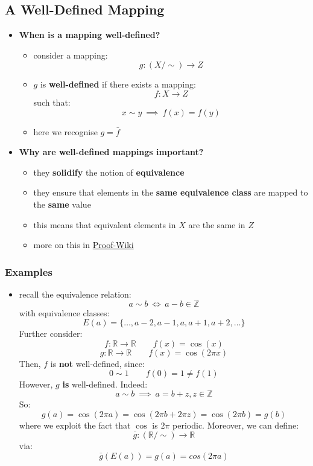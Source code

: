 \documentclass{exam}
\begin{document}
\subsection{A Well-Defined Mapping}

\begin{itemize}
    \item \textbf{When is a mapping well-defined?}
    \begin{itemize}
        \item consider a mapping:
        \[
        g : (X/\sim) \to Z
        \]
        \item $g$ is \textbf{well-defined} if there exists a mapping:
        \[
        f : X \to Z
        \]
        such that:
        \[
        x \sim y \ \implies \ f(x) = f(y)
        \]
        \item here we recognise $g = \bar{f}$
    \end{itemize}
    \item \textbf{Why are well-defined mappings important?}
    \begin{itemize}
        \item they \textbf{solidify} the notion of \textbf{equivalence}
        \item they ensure that elements in the \textbf{same equivalence class} are mapped to the \textbf{same} value
        \item this means that equivalent elements in $X$ are the same in $Z$
        \item more on this in \href{https://proofwiki.org/wiki/Definition:Well-Defined/Mapping}{Proof-Wiki}
    \end{itemize}
\end{itemize}

\subsubsection{Examples}

\begin{itemize}
    \item recall the equivalence relation:
    \[
    a \sim b \ \iff \ a - b \in \mathbb{Z}
    \]
    with equivalence classes:
    \[
    E(a) = \{\ldots, a-2, a-1, a, a+1, a+2, \ldots \}
    \]
    Further consider:
    \[
    f : \mathbb{R} \to \mathbb{R} \qquad f(x) = \cos(x)
    \]
    \[
    g : \mathbb{R} \to \mathbb{R} \qquad f(x) = \cos(2\pi x)
    \]
    Then, $f$ is \textbf{not} well-defined, since:
    \[
    0 \sim 1 \qquad f(0) = 1 \neq f(1)
    \]
    However, $g$ \textbf{is} well-defined. Indeed:
    \[
    a \sim b \ \implies \ a = b+z, z \in \mathbb{Z}
    \]
    So:
    \[
    g(a) = \cos(2\pi a) = \cos(2\pi b + 2\pi z) = \cos(2\pi b) = g(b)
    \]
    where we exploit the fact that $\cos$ is $2\pi$ periodic.
    \smallskip 
    Moreover, we can define:
    \[
    \bar{g} : (\mathbb{R} / \sim) \to \mathbb{R}
    \]
    via:
    \[
    \bar{g}(E(a)) = g(a) = cos(2\pi a)
    \]
\end{itemize}
\end{document}
